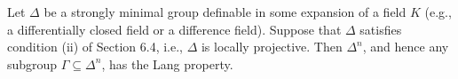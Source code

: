 Let $\Delta$ be a strongly minimal group definable in some expansion of a field $K$ (e.g., a differentially closed field or a difference field). Suppose that $\Delta$ satisfies condition (ii) of Section 6.4, i.e., $\Delta$ is locally projective. Then $\Delta^n$, and hence any subgroup $\Gamma \subseteq \Delta^n$, has the Lang property.
